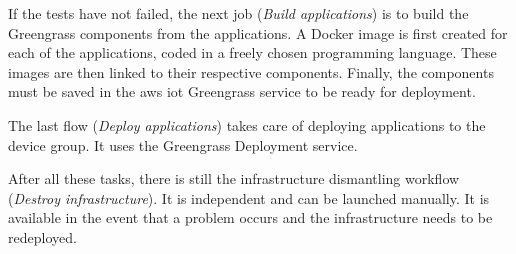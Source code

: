 If the tests have not failed, the next job (\textit{Build applications}) is to build the Greengrass components from the applications. A Docker image is first created for each of the applications, coded in a freely chosen programming language. These images are then linked to their respective components. Finally, the components must be saved in the \gls{aws} \acrshort{iot} Greengrass service to be ready for deployment.

The last flow (\textit{Deploy applications}) takes care of deploying applications to the device group. It uses the Greengrass Deployment service.

After all these tasks, there is still the infrastructure dismantling workflow (\textit{Destroy infrastructure}). It is independent and can be launched manually. It is available in the event that a problem occurs and the infrastructure needs to be redeployed.